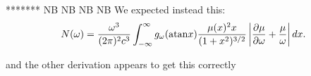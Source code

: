 \documentclass[]{article}
\begin{document}
*******
NB NB NB NB We expected instead this:
\begin{equation}\label{N_IBP}
N(\omega) = \frac{\omega^3}{(2\pi)^2 c^3} \int_{-\infty}^\infty g_\omega( \mathrm{atan} x ) 
 \frac{\mu(x)^2 x}{(1+x^2)^{3/2}}
 \left| \frac{\partial \mu}{\partial \omega} + \frac {\mu}{\omega}\right|
 d x .
\end{equation}

and the other derivation appears to get this correctly
\end{document}
